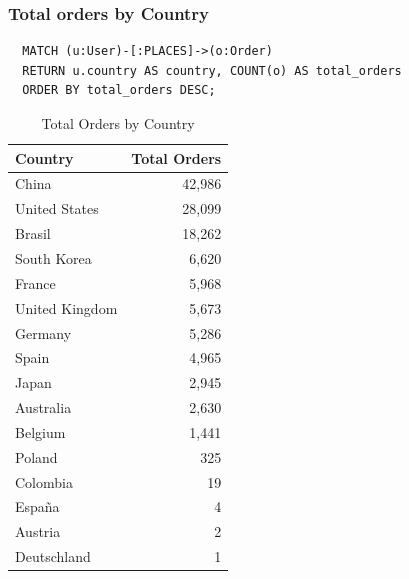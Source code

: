 \documentclass[a4paper,12pt]{article}
\begin{document}
\subsubsection{Total orders by Country}
\begin{verbatim}
  MATCH (u:User)-[:PLACES]->(o:Order)
  RETURN u.country AS country, COUNT(o) AS total_orders
  ORDER BY total_orders DESC;
\end{verbatim}
\begin{table}[h!]
  \centering
  \caption{Total Orders by Country}
  \label{tab:total_orders}
  \begin{tabular}{l r}
      \toprule
      \textbf{Country} & \textbf{Total Orders} \\
      \midrule
      China           & 42,986 \\
      United States   & 28,099 \\
      Brasil          & 18,262 \\
      South Korea     & 6,620  \\
      France          & 5,968  \\
      United Kingdom  & 5,673  \\
      Germany         & 5,286  \\
      Spain           & 4,965  \\
      Japan           & 2,945  \\
      Australia       & 2,630  \\
      Belgium         & 1,441  \\
      Poland          & 325    \\
      Colombia        & 19     \\
      España          & 4      \\
      Austria         & 2      \\
      Deutschland     & 1      \\
      \bottomrule
  \end{tabular}
\end{table}
\end{document}
